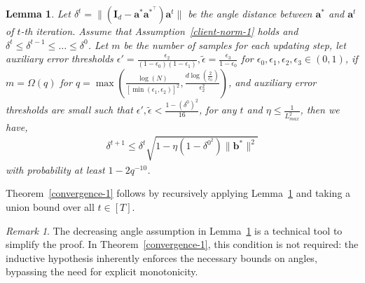 \documentclass{article}
\theoremstyle{plain}
\newtheorem{lemma}[theorem]{Lemma}
\theoremstyle{definition}
\theoremstyle{remark}
\newtheorem{remark}[theorem]{Remark}
\begin{document}
\begin{lemma}\label{lemma:delta-t}
    Let $\delta^t = \lVert (\mathbf{I}_d-\mathbf{a}^*\mathbf{a}^{*^\top})\mathbf{a}^t\rVert $ be the angle distance between $\mathbf{a}^{*}$ and $\mathbf{a}^{t}$ of $t$-th iteration. Assume that Assumption~\ref{client-norm-1} holds and $\delta^t \leq \delta^{t-1} \leq \dots \leq \delta^0$. Let $m$ be the number of samples for each updating step, let auxiliary error thresholds $\epsilon'=\frac{\epsilon_2}{(1-\epsilon_0)(1-\epsilon_1)},\tilde{\epsilon}=\frac{\epsilon_3}{1-\epsilon_0}$ for $\epsilon_0, \epsilon_1, \epsilon_2, \epsilon_3 \in (0,1)$, if $
    m= \Omega(q)$ for $q=\max\left(\frac{\log(N)}{[\min(\epsilon_1,\epsilon_2)]^2},\frac{d\log(\frac{2}{\epsilon_0})}{\epsilon_2^2}\right)$,
    and auxiliary error thresholds are small such that $\epsilon',\tilde{\epsilon}<\frac{1-(\delta^0)^2}{16}$, for any $t$ and $\eta \leq \frac{1}{L_{max}^2}$, then we have,
    \begin{align}
        \delta^{t+1} \leq \delta^{t} \sqrt{1-\eta (1-\delta^{0^2})\|\mathbf b^*\|^2} 
    \end{align}
    with probability at least $1-2q^{-10}$.
\end{lemma}

Theorem~\ref{convergence-1} follows by recursively applying Lemma~\ref{lemma:delta-t} and taking a union bound over all $t\in[T]$.
\begin{remark}
The decreasing angle assumption in Lemma~\ref{lemma:delta-t} is a technical tool to simplify the proof. In Theorem~\ref{convergence-1}, this condition is not required: the inductive hypothesis inherently enforces the necessary bounds on angles, bypassing the need for explicit monotonicity.
\end{remark}
\end{document}
